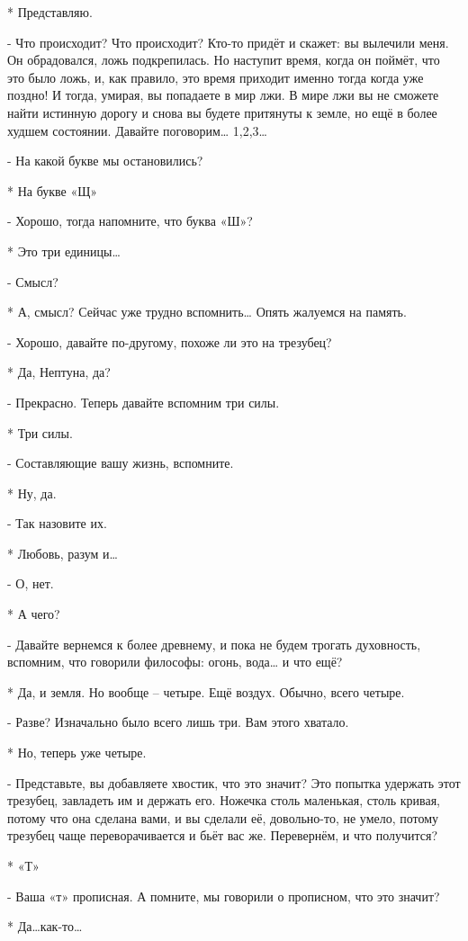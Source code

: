* Представляю.

- Что происходит? Что происходит? Кто-то придёт и скажет: вы вылечили меня. Он обрадовался, ложь подкрепилась. Но наступит время, когда он поймёт, что это было ложь, и, как правило, это время приходит именно тогда когда уже поздно! И тогда, умирая, вы попадаете в мир лжи. В мире лжи вы не сможете найти истинную дорогу и снова вы будете притянуты к земле, но ещё в более худшем состоянии. Давайте поговорим… 
1,2,3…

- На какой букве мы остановились?

* На букве «Щ»

- Хорошо, тогда напомните, что  буква «Ш»?

* Это три единицы…

- Смысл?

* А, смысл? Сейчас уже трудно вспомнить… Опять жалуемся на память.

- Хорошо, давайте по-другому, похоже ли это на трезубец?

* Да, Нептуна, да?

- Прекрасно. Теперь давайте вспомним три силы.

* Три силы.

- Составляющие вашу жизнь, вспомните.

* Ну, да.

- Так назовите их.

* Любовь, разум и…

- О, нет.

* А чего?

- Давайте вернемся к более древнему, и пока не будем трогать духовность, вспомним, что говорили философы: огонь, вода… и что ещё?

* Да, и земля. Но вообще – четыре. Ещё воздух. Обычно, всего четыре.

- Разве? Изначально было всего лишь три. Вам этого хватало.

* Но, теперь уже четыре.

- Представьте, вы добавляете хвостик, что это значит? Это попытка удержать этот трезубец, завладеть им и держать его. Ножечка столь маленькая, столь кривая, потому что она сделана вами, и вы сделали её, довольно-то, не умело, потому трезубец чаще переворачивается и бьёт вас же. Перевернём, и что получится?

* «Т»

- Ваша «т» прописная. А помните, мы говорили о прописном, что это значит?

* Да…как-то…

